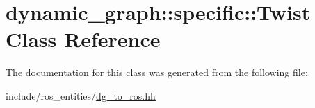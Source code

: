 \hypertarget{classdynamic__graph_1_1specific_1_1Twist}{}\section{dynamic\+\_\+graph\+:\+:specific\+:\+:Twist Class Reference}
\label{classdynamic__graph_1_1specific_1_1Twist}


The documentation for this class was generated from the following file\+:\begin{DoxyCompactItemize}
\item 
include/ros\+\_\+entities/\hyperlink{dg__to__ros_8hh}{dg\+\_\+to\+\_\+ros.\+hh}\end{DoxyCompactItemize}
